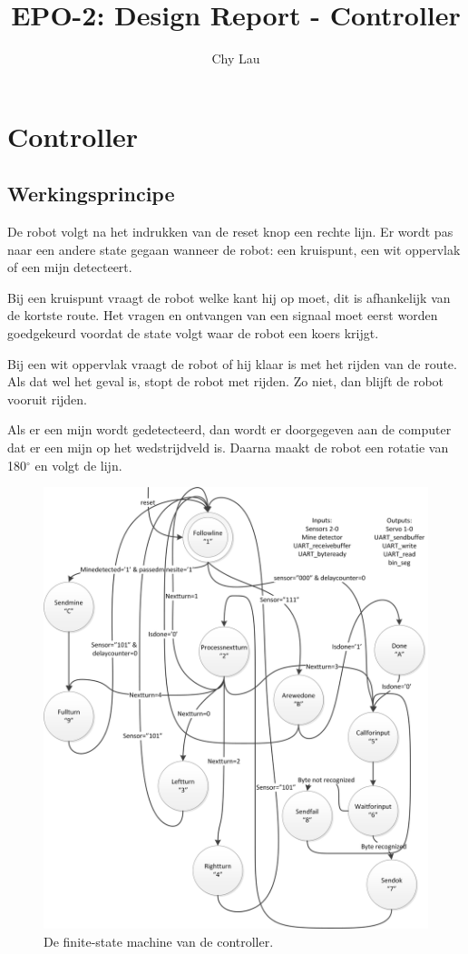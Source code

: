 \documentclass{report}
\title{EPO-2: Design Report - Controller}
\author{Chy Lau}
\begin{document}
\chapter{Controller}
\label{ch:controller}

\section{Werkingsprincipe}
De robot volgt na het indrukken van de reset knop een rechte lijn. Er wordt pas naar een andere state gegaan wanneer de robot: een kruispunt, een wit oppervlak of een mijn detecteert. 

Bij een kruispunt vraagt de robot welke kant hij op moet, dit is afhankelijk van de kortste route. Het vragen en ontvangen van een signaal moet eerst worden goedgekeurd voordat de state volgt waar de robot een koers krijgt. 

Bij een wit oppervlak vraagt de robot of hij klaar is met het rijden van de route. Als dat wel het geval is, stopt de robot met rijden. Zo niet, dan blijft de robot vooruit rijden.

Als er een mijn wordt gedetecteerd, dan wordt er doorgegeven aan de computer dat er een mijn op het wedstrijdveld is. Daarna maakt de robot een rotatie van 180$^\circ$ en volgt de lijn.

\begin{figure}
\centering
\includegraphics[scale=0.5]{FSMMain.png}
\caption{De finite-state machine van de controller.}
\label{fig:fsmmain}
\end{figure}
\end{document}
